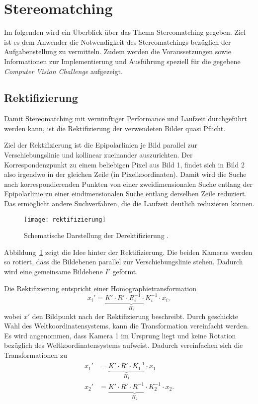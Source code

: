 \section{Stereomatching}
Im folgenden wird ein Überblick über das Thema Stereomatching gegeben. 
Ziel ist es dem Anwender die Notwendigkeit des Stereomatchings bezüglich der Aufgabenstellung zu vermitteln. Zudem werden die Voraussetzungen sowie Informationen zur Implementierung und Ausführung speziell für die gegebene \textit{Computer Vision Challenge} aufgezeigt.

\subsection{Rektifizierung}
\label{ssec:rektifizierung}
Damit Stereomatching mit vernünftiger Performance und Laufzeit durchgeführt werden kann, ist die Rektifizierung der verwendeten Bilder quasi Pflicht.

Ziel der Rektifizierung ist die Epipolarlinien je Bild parallel zur Verschiebungslinie und kollinear zueinander auszurichten. Der Korrespondenzpunkt zu einem beliebigen Pixel aus Bild 1, findet sich in Bild 2 also irgendwo in der gleichen Zeile (in Pixelkoordinaten). Damit wird die Suche nach korrespondierenden Punkten von einer zweidimensionalen Suche entlang der Epipolarlinie zu einer eindimensionalen Suche entlang derselben Zeile reduziert. Das ermöglicht andere Suchverfahren, die die Laufzeit deutlich reduzieren können.

\begin{figure}[!h]
	\centering
	\texttt{[image: rektifizierung]}
	\caption{Schematische Darstellung der Derektifizierung \cite[S. 39]{Morvan}.}
	\label{fig:rektifizierung}
\end{figure}

Abbildung~\ref{fig:rektifizierung} zeigt die Idee hinter der Rektifizierung. Die beiden Kameras werden so rotiert, dass die Bildebenen parallel zur Verschiebungslinie stehen. Dadurch wird eine gemeinsame Bildebene $I'$ geformt.

Die Rektifizierung entspricht einer Homographietransformation
\begin{equation}
	x_i' = \underbrace{K' \cdot R' \cdot R_i^{-1} \cdot K_i^{-1}}_{H_i} \cdot x_i,
\end{equation}
wobei $x'$ den Bildpunkt nach der Rektifizierung beschreibt. Durch geschickte Wahl des Weltkoordinatensystems, kann die Transformation vereinfacht werden. Es wird angenommen, dass Kamera 1 im Ursprung liegt und keine Rotation bezüglich des Weltkoordinatensystems aufweist. Dadurch vereinfachen sich die Transformationen zu
\begin{align}
	x_1' &= \underbrace{K' \cdot R' \cdot K_1^{-1}}_{H_1} \cdot x_1\\
	x_2' &= \underbrace{K' \cdot R' \cdot R^{-1} \cdot K_2^{-1}}_{H_2} \cdot x_2.
\end{align}

